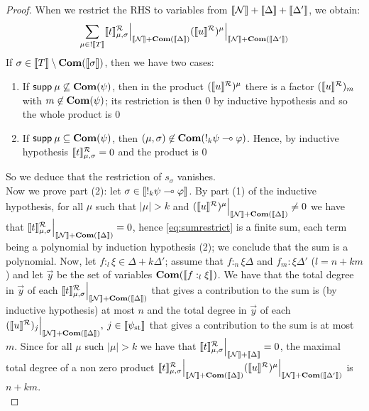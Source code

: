 \begin{proof}
	When we restrict the RHS to variables from $\llbracket\mathcal{N}\rrbracket+ \llbracket\Delta\rrbracket+ \llbracket\Delta'\rrbracket$, we obtain:
	\begin{equation}
		\label{eq:sumrestrict}
	\sum_{\mu \in !{\llbracket T\rrbracket}} \llbracket t\rrbracket^{\mathcal{R}}_{\mu, \sigma} \Big\vert_{\llbracket\mathcal{N}\rrbracket+ \mathbf{Com}(\llbracket\Delta\rrbracket)} (\llbracket u\rrbracket^{\mathcal{R}})^\mu \Big\vert_{\llbracket\mathcal{N}\rrbracket+ \mathbf{Com}(\llbracket\Delta'\rrbracket)}
	\end{equation}
	If $\sigma \in \llbracket T\rrbracket \setminus \mathbf{Com}(\llbracket\sigma\rrbracket)$, then we have two cases:
	\begin{enumerate}
		\item If $\mathsf{supp} \: \mu \not \subseteq \mathbf{Com}(\psi)$, then in the product $(\llbracket u\rrbracket^{\mathcal{R}})^\mu$ there is a factor $(\llbracket u\rrbracket^{\mathcal{R}})_m$ with $m \not \in  \mathbf{Com}(\psi)$; its restriction is then $0$ by inductive hypothesis and so the whole product is $0$
		\item If $\mathsf{supp} \: \mu \subseteq \mathbf{Com}(\psi)$, then $(\mu, \sigma) \not \in \mathbf{Com}(!_k \psi \multimap \varphi)$. Hence, by inductive hypothesis $\llbracket t\rrbracket^{\mathcal{R}}_{\mu, \sigma}=0$ and the product is $0$
	\end{enumerate}
	So we deduce that the restriction of $s_\sigma$ vanishes.\\
	Now we prove part (2): let $\sigma \in \llbracket!_k\psi \multimap \varphi\rrbracket$. By part (1) of the inductive hypothesis, for all $\mu$ such that  $|\mu|>k$ and $(\llbracket u\rrbracket^{\mathcal{R}})^\mu \Big\vert_{\llbracket\mathcal{N}\rrbracket+ \mathbf{Com}(\llbracket\Delta\rrbracket)} \neq 0$  we have that $\llbracket t\rrbracket^{\mathcal{R}}_{\mu, \sigma} \Big\vert_{\llbracket\mathcal{N}\rrbracket+ \mathbf{Com}(\llbracket\Delta\rrbracket)}=0$, hence \ref{eq:sumrestrict} is a finite sum, each term being a polynomial by induction hypothesis (2); we conclude that the sum is a polynomial. Now, let $f:_l \xi \in \Delta + k\Delta'$; assume that $f:_n \xi {\Delta}$ and $f_m: \xi {\Delta'}$ ($l= n+km$) and let $\vec y$ be the set of variables $\mathbf{Com}(\llbracket{f:_l \xi}\rrbracket)$. We have that the total degree in $\vec y$ of each $\llbracket t\rrbracket^{\mathcal{R}}_{\mu, \sigma} \Big\vert_{\llbracket\mathcal{N}\rrbracket+ \mathbf{Com}(\llbracket\Delta\rrbracket)}$ that gives a contribution to the sum is (by inductive hypothesis) at most $n$ and the total degree in $\vec y$ of each   $(\llbracket u\rrbracket^{\mathcal{R}})_{j}\Big\vert_{\llbracket\mathcal{N}\rrbracket+ \mathbf{Com}(\llbracket\Delta\rrbracket)}, \: j \in \llbracket{\psi}_{\mathrm{st}}\rrbracket$  that gives a contribution to the sum is at most $m$. Since for all $\mu$ such $|\mu|>k$ we have  that $\llbracket t\rrbracket^{\mathcal{R}}_{\mu, \sigma} \Big\vert_{\llbracket\mathcal{N}\rrbracket+ \llbracket\Delta\rrbracket}=0$, the maximal total degree of a non zero product $\llbracket t\rrbracket^{\mathcal{R}}_{\mu, \sigma} \Big\vert_{\llbracket\mathcal{N}\rrbracket+ \mathbf{Com}(\llbracket\Delta\rrbracket)} (\llbracket u\rrbracket^{\mathcal{R}})^\mu \Big\vert_{\llbracket\mathcal{N}\rrbracket+ \mathbf{Com}(\llbracket\Delta'\rrbracket)}$ is $n+km$.\\

\end{proof}

